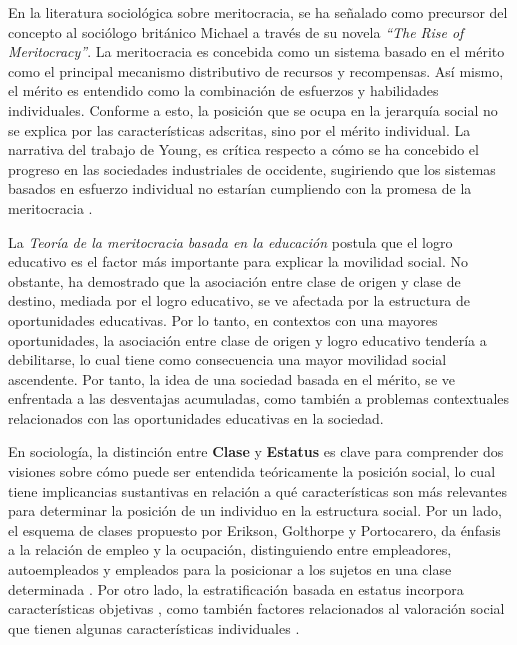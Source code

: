 \documentclass[12pt]{article}
\begin{document}
En la literatura sociológica sobre meritocracia, se ha señalado como precursor del concepto al sociólogo británico Michael \citet{Young1961} a través de su novela \textit{“The Rise of Meritocracy”}. La meritocracia es concebida como un sistema basado en el mérito como el principal mecanismo distributivo de recursos y recompensas. Así mismo, el mérito es entendido como la combinación de esfuerzos y habilidades individuales. Conforme a esto, la posición que se ocupa en la jerarquía social no se explica por las características adscritas, sino por el mérito individual. La narrativa del trabajo de Young, es crítica respecto a cómo se ha concebido el progreso en las sociedades industriales de occidente, sugiriendo que los sistemas basados en esfuerzo individual no estarían cumpliendo con la promesa de la meritocracia \citep{Horowitz2006,Ratner2014}. 

La \textit{Teoría de la meritocracia basada en la educación} postula que el logro educativo es el factor más importante para explicar la movilidad social. No obstante, \cite{Goldthorpe2003} ha demostrado que la asociación entre clase de origen y clase de destino, mediada por el logro educativo, se ve afectada por la estructura de oportunidades educativas. Por lo tanto, en contextos con una mayores oportunidades, la asociación entre clase de origen y logro educativo tendería a debilitarse, lo cual tiene como consecuencia una mayor movilidad social ascendente. Por tanto, la idea de una sociedad basada en el mérito, se ve enfrentada a las desventajas acumuladas, como también a problemas contextuales relacionados con las oportunidades educativas en la sociedad. 

En sociología, la distinción entre \textbf{Clase} y \textbf{Estatus} es clave para comprender dos visiones sobre cómo puede ser entendida teóricamente la posición social, lo cual tiene implicancias sustantivas en relación a qué características son más relevantes para determinar la posición de un individuo en la estructura social. Por un lado, el esquema de clases propuesto por Erikson, Golthorpe y Portocarero, da énfasis a la relación de empleo y la ocupación, distinguiendo entre empleadores, autoempleados y empleados para la posicionar a los sujetos en una clase determinada \citep{Erikson1979,Erikson2002}. Por otro lado, la estratificación basada en estatus incorpora características objetivas \citep{Ganzeboom1992,Andersson2018}, como también factores relacionados al valoración social que tienen algunas características individuales \citep{Ridgeway2014}.        
\end{document}

